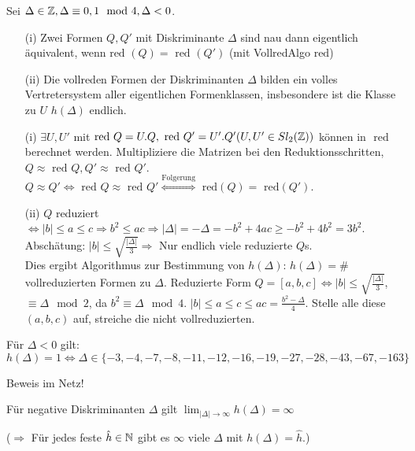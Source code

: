 \documentclass[a4paper,twoside,DIV15,BCOR12mm]{scrbook}
\begin{document}
\begin{satz}
Sei $\Delta \in \mathbb{Z}, \Delta \equiv 0,1 \mod 4, \Delta < 0$.
\begin{itemize}
\item[(i)] Zwei Formen $Q, Q'$ mit Diskriminante $\Delta$ sind nau dann eigentlich äquivalent, wenn $\text{red }(Q) = \text{ red }(Q')$ (mit VollredAlgo $\text{red}$)
\item[(ii)] Die vollreden Formen der Diskriminanten $\Delta$ bilden ein volles Vertretersystem aller eigentlichen Formenklassen, insbesondere ist die Klasse zu $U$ $h(\Delta)$ endlich.
\end{itemize}
\end{satz}

\begin{beweis}
\begin{itemize}
\item [(i)] $\exists U, U'$ mit $\text{red }Q = U.Q, \text{ red }Q' = U'.Q' (U, U' \in Sl_2(\mathbb{Z}))$ können in $\text{ red }$ berechnet werden. Multipliziere die Matrizen bei den Reduktionsschritten, $Q \approx \text{ red }Q, Q' \approx \text{ red }Q'$. $Q \approx Q' \Leftrightarrow \text{ red }Q \approx \text{ red }Q' \stackrel{\text{Folgerung}}{\Leftrightarrow} \text{ red}(Q) = \text{ red}(Q')$.
\item[(ii)] $Q$ reduziert $\Leftrightarrow |b| \le a \le c \Rightarrow b^2 \le ac \Rightarrow |\Delta| = -\Delta = -b^2 + 4ac \ge -b^2 + 4b^2 = 3b^2$. Abschätung: $|b| \le \sqrt{\frac{|\Delta|}{3}} \Rightarrow$ Nur endlich viele reduzierte $Q$s.\\
Dies ergibt Algorithmus zur Bestimmung von $h(\Delta)$: $h(\Delta) = \#$ vollreduzierten Formen zu $\Delta$. Reduzierte Form $Q = [a,b,c] \Leftrightarrow |b| \le \sqrt{\frac{|\Delta|}{3}}$, $\equiv \Delta \mod 2$, da $b^2 \equiv \Delta \mod 4$. $|b| \le a \le c \le ac = \frac{b^2 - \Delta}{4}$. Stelle alle diese $(a,b,c)$ auf, streiche die nicht vollreduzierten.
\end{itemize}
\end{beweis}

\begin{satz}
Für $\Delta < 0$ gilt: $h(\Delta) = 1 \Leftrightarrow \Delta \in \{-3,-4,-7,-8,-11,-12,-16,-19,-27,-28,-43,-67,-163\}$
\end{satz}
Beweis im Netz!

\begin{satz}[Siegel]
Für negative Diskriminanten $\Delta$ gilt $\lim_{|\Delta| \to \infty} h(\Delta) = \infty$
\end{satz}
($\Rightarrow$ Für jedes feste $\hat h \in \mathbb{N}$ gibt es $\infty$ viele $\Delta$ mit $h(\Delta) = \hat h$.)
\end{document}
